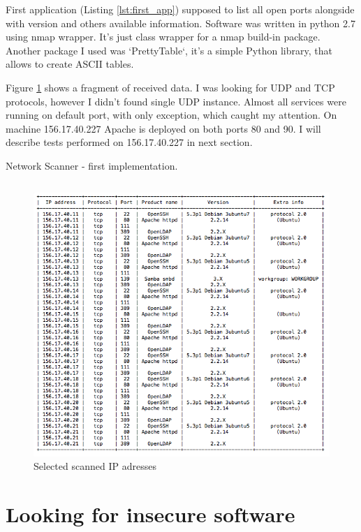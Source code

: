 \documentclass[a4paper, 11pt]{article}
\begin{document}
First application (Listing \ref{lst:first_app}) supposed to list all open ports alongside with version and others available information.
Software was written in python 2.7 using nmap wrapper. It's just class wrapper for a nmap build-in package.
Another package I used was `PrettyTable`, it's a simple Python library, that allows to create ASCII tables.

Figure \ref{fig:all_server_list} shows a fragment of received data. I was looking for UDP and TCP protocols, however I didn't found single UDP instance.
Almost all services were running on default port, with only exception, which caught my attention. On machine 156.17.40.227 Apache is deployed on both ports 80 and 90. I will describe tests performed on 156.17.40.227 in next section.

\begin{listing}[!htb]    
\caption{Network Scanner - first implementation.}    
\inputminted[mathescape, fontfamily=tt, frame=leftline,framerule=0.4pt,framesep=2mm]{python}{scripts/scan_all.py}
\label{lst:first_app}    
\end{listing}

\begin{figure}[!htb]
  \centering
      \includegraphics[width=1\textwidth]{tables/port_scan_all}
  \caption{Selected scanned IP adresses}
  \label{fig:all_server_list}    
\end{figure}


\section*{Looking for insecure software}
\end{document}
